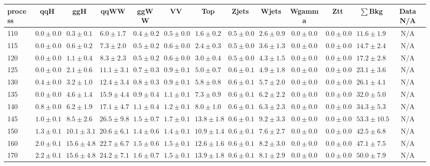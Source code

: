 \begin{table}
{%
 \tiny
 \begin{center}
 \begin{tabular}{l | c c | c c c c c c c c  | c c}
 \hline
 process & qqH & ggH & qqWW & ggWW & VV & Top & Zjets & Wjets & Wgamma & Ztt & $\sum$Bkg & Data N/A \\
 \hline
110 & $0.0\pm0.0$ & $0.3\pm0.1$ & $6.0\pm1.7$ & $0.4\pm0.2$ & $0.5\pm0.0$ & $1.6\pm0.2$ & $0.5\pm0.0$ & $2.6\pm0.9$ & $0.0\pm0.0$ & $0.0\pm0.0$ & $11.6\pm1.9$ &  N/A \\
115 & $0.0\pm0.0$ & $0.6\pm0.2$ & $7.3\pm2.0$ & $0.5\pm0.2$ & $0.6\pm0.0$ & $2.4\pm0.3$ & $0.5\pm0.0$ & $3.6\pm1.3$ & $0.0\pm0.0$ & $0.0\pm0.0$ & $14.7\pm2.4$ &  N/A \\
120 & $0.0\pm0.0$ & $1.1\pm0.4$ & $8.3\pm2.3$ & $0.5\pm0.2$ & $0.6\pm0.0$ & $3.0\pm0.4$ & $0.5\pm0.0$ & $4.3\pm1.5$ & $0.0\pm0.0$ & $0.0\pm0.0$ & $17.2\pm2.8$ &  N/A \\
125 & $0.0\pm0.0$ & $2.1\pm0.6$ & $11.1\pm3.1$ & $0.7\pm0.3$ & $0.9\pm0.1$ & $5.0\pm0.7$ & $0.6\pm0.1$ & $4.9\pm1.8$ & $0.0\pm0.0$ & $0.0\pm0.0$ & $23.1\pm3.6$ &  N/A \\
130 & $0.4\pm0.0$ & $3.2\pm1.0$ & $12.4\pm3.4$ & $0.8\pm0.3$ & $0.9\pm0.1$ & $5.8\pm0.8$ & $0.6\pm0.1$ & $5.7\pm2.0$ & $0.0\pm0.0$ & $0.0\pm0.0$ & $26.1\pm4.1$ &  N/A \\
135 & $0.0\pm0.0$ & $4.6\pm1.4$ & $15.9\pm4.4$ & $0.9\pm0.4$ & $1.1\pm0.1$ & $7.3\pm0.9$ & $0.6\pm0.1$ & $6.2\pm2.2$ & $0.0\pm0.0$ & $0.0\pm0.0$ & $32.0\pm5.0$ &  N/A \\
140 & $0.8\pm0.0$ & $6.2\pm1.9$ & $17.1\pm4.7$ & $1.1\pm0.4$ & $1.2\pm0.1$ & $8.0\pm1.0$ & $0.6\pm0.1$ & $6.3\pm2.3$ & $0.0\pm0.0$ & $0.0\pm0.0$ & $34.3\pm5.3$ &  N/A \\
145 & $1.0\pm0.1$ & $8.5\pm2.6$ & $26.5\pm9.8$ & $1.5\pm0.7$ & $1.7\pm0.1$ & $13.8\pm1.8$ & $0.6\pm0.1$ & $9.2\pm3.3$ & $0.0\pm0.0$ & $0.0\pm0.0$ & $53.3\pm10.5$ &  N/A \\
150 & $1.3\pm0.1$ & $10.1\pm3.1$ & $20.6\pm6.1$ & $1.4\pm0.6$ & $1.4\pm0.1$ & $10.9\pm1.4$ & $0.6\pm0.1$ & $7.6\pm2.7$ & $0.0\pm0.0$ & $0.0\pm0.0$ & $42.5\pm6.8$ &  N/A \\
160 & $2.0\pm0.1$ & $15.6\pm4.8$ & $22.7\pm6.7$ & $1.5\pm0.6$ & $1.5\pm0.1$ & $12.6\pm1.6$ & $0.6\pm0.1$ & $8.2\pm3.0$ & $0.0\pm0.0$ & $0.0\pm0.0$ & $47.1\pm7.5$ &  N/A \\
170 & $2.2\pm0.1$ & $15.6\pm4.8$ & $24.2\pm7.1$ & $1.6\pm0.7$ & $1.5\pm0.1$ & $13.9\pm1.8$ & $0.6\pm0.1$ & $8.1\pm2.9$ & $0.0\pm0.0$ & $0.0\pm0.0$ & $50.0\pm7.9$ &  N/A \\

\end{tabular}
\end{center}}
\end{table}

